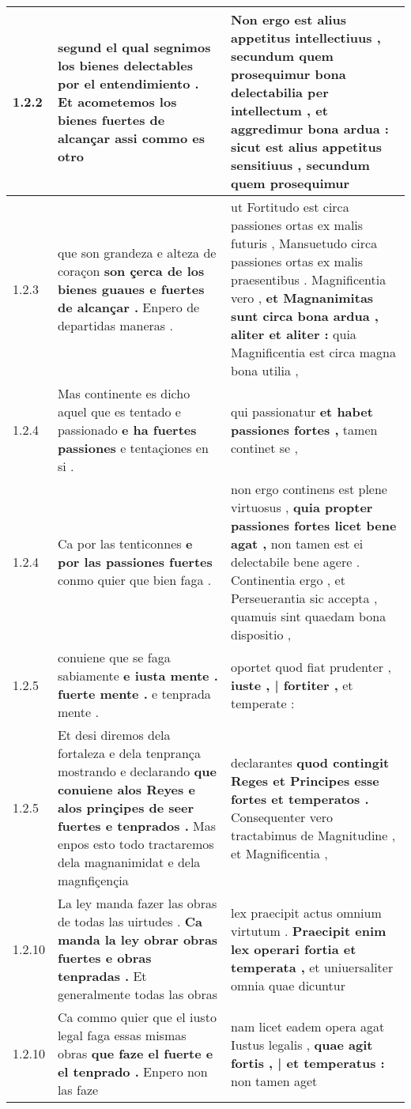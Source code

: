 \begin{tabular}{|p{1cm}|p{6.5cm}|p{6.5cm}|}
1.2.2 & segund el qual segnimos los bienes delectables por el entendimiento . \textbf{ Et acometemos los bienes fuertes de alcançar } assi commo es otro & Non ergo est alius appetitus intellectiuus , \textbf{ secundum quem prosequimur bona delectabilia per intellectum , et aggredimur bona ardua : sicut est alius appetitus sensitiuus , } secundum quem prosequimur \\\hline
1.2.3 & que son grandeza e alteza de coraçon \textbf{ son çerca de los bienes guaues e fuertes de alcançar . } Enpero de departidas maneras . & ut Fortitudo est circa passiones ortas ex malis futuris , Mansuetudo circa passiones ortas ex malis praesentibus . Magnificentia vero , \textbf{ et Magnanimitas sunt circa bona ardua , aliter et aliter : } quia Magnificentia est circa magna bona utilia , \\\hline
1.2.4 & Mas continente es dicho aquel que es tentado e passionado \textbf{ e ha fuertes passiones } e tentaçiones en si . & qui passionatur \textbf{ et habet passiones fortes , } tamen continet se , \\\hline
1.2.4 & Ca por las tenticonnes \textbf{ e por las passiones fuertes } conmo quier que bien faga . & non ergo continens est plene virtuosus , \textbf{ quia propter passiones fortes licet bene agat , } non tamen est ei delectabile bene agere . Continentia ergo , et Perseuerantia sic accepta , quamuis sint quaedam bona dispositio , \\\hline
1.2.5 & conuiene que se faga sabiamente \textbf{ e iusta mente . fuerte mente . } e tenprada mente . & oportet quod fiat prudenter , \textbf{ iuste , | fortiter , } et temperate : \\\hline
1.2.5 & Et desi diremos dela fortaleza e dela tenprança mostrando e declarando \textbf{ que conuiene alos Reyes e alos prinçipes de seer fuertes e tenprados . } Mas enpos esto todo tractaremos dela magnanimidat e dela magnfiçençia & declarantes \textbf{ quod contingit Reges et Principes esse fortes et temperatos . } Consequenter vero tractabimus de Magnitudine , et Magnificentia , \\\hline
1.2.10 & La ley manda fazer las obras de todas las uirtudes . \textbf{ Ca manda la ley obrar obras fuertes e obras tenpradas . } Et generalmente todas las obras & lex praecipit actus omnium virtutum . \textbf{ Praecipit enim lex operari fortia et temperata , } et uniuersaliter omnia quae dicuntur \\\hline
1.2.10 & Ca commo quier que el iusto legal faga essas mismas obras \textbf{ que faze el fuerte e el tenprado . } Enpero non las faze & nam licet eadem opera agat Iustus legalis , \textbf{ quae agit fortis , | et temperatus : } non tamen aget \\\hline

\end{tabular}

